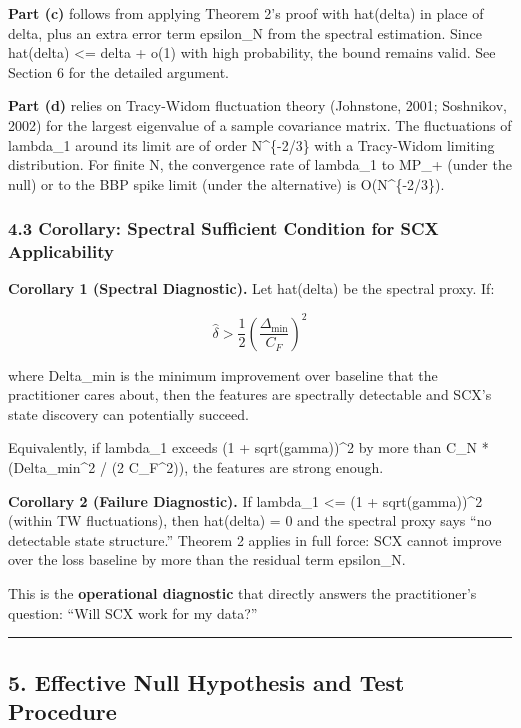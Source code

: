\documentclass[
  12pt,
]{article}
\begin{document}
\textbf{Part (c)} follows from applying Theorem 2's proof with
hat(delta) in place of delta, plus an extra error term epsilon\_N from
the spectral estimation. Since hat(delta) \textless= delta + o(1) with
high probability, the bound remains valid. See Section 6 for the
detailed argument.

\textbf{Part (d)} relies on Tracy-Widom fluctuation theory (Johnstone,
2001; Soshnikov, 2002) for the largest eigenvalue of a sample covariance
matrix. The fluctuations of lambda\_1 around its limit are of order
N\^{}\{-2/3\} with a Tracy-Widom limiting distribution. For finite N,
the convergence rate of lambda\_1 to MP\_+ (under the null) or to the
BBP spike limit (under the alternative) is O(N\^{}\{-2/3\}).

\subsubsection{4.3 Corollary: Spectral Sufficient Condition for SCX
Applicability}\label{corollary-spectral-sufficient-condition-for-scx-applicability}

\textbf{Corollary 1 (Spectral Diagnostic).} Let hat(delta) be the
spectral proxy. If:

\[\hat{\delta} > \frac{1}{2} \left(\frac{\Delta_{\min}}{C_F}\right)^2\]

where Delta\_min is the minimum improvement over baseline that the
practitioner cares about, then the features are spectrally detectable
and SCX's state discovery can potentially succeed.

Equivalently, if lambda\_1 exceeds (1 + sqrt(gamma))\^{}2 by more than
C\_N * (Delta\_min\^{}2 / (2 C\_F\^{}2)), the features are strong
enough.

\textbf{Corollary 2 (Failure Diagnostic).} If lambda\_1 \textless= (1 +
sqrt(gamma))\^{}2 (within TW fluctuations), then hat(delta) = 0 and the
spectral proxy says ``no detectable state structure.'' Theorem 2 applies
in full force: SCX cannot improve over the loss baseline by more than
the residual term epsilon\_N.

This is the \textbf{operational diagnostic} that directly answers the
practitioner's question: ``Will SCX work for my data?''

\begin{center}\rule{0.5\linewidth}{0.5pt}\end{center}

\subsection{5. Effective Null Hypothesis and Test
Procedure}\label{effective-null-hypothesis-and-test-procedure}
\end{document}
